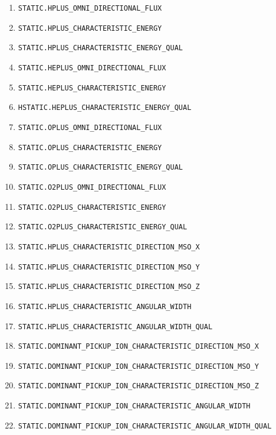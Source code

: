 \documentclass{article}
\begin{document}
\begin{enumerate}
    \item \texttt{STATIC.HPLUS\_OMNI\_DIRECTIONAL\_FLUX}
    \item \texttt{STATIC.HPLUS\_CHARACTERISTIC\_ENERGY}
    \item \texttt{STATIC.HPLUS\_CHARACTERISTIC\_ENERGY\_QUAL}
    \item \texttt{STATIC.HEPLUS\_OMNI\_DIRECTIONAL\_FLUX}
    \item \texttt{STATIC.HEPLUS\_CHARACTERISTIC\_ENERGY}
    \item \texttt{HSTATIC.HEPLUS\_CHARACTERISTIC\_ENERGY\_QUAL}
    \item \texttt{STATIC.OPLUS\_OMNI\_DIRECTIONAL\_FLUX}
    \item \texttt{STATIC.OPLUS\_CHARACTERISTIC\_ENERGY}
    \item \texttt{STATIC.OPLUS\_CHARACTERISTIC\_ENERGY\_QUAL}
    \item \texttt{STATIC.O2PLUS\_OMNI\_DIRECTIONAL\_FLUX}
    \item \texttt{STATIC.O2PLUS\_CHARACTERISTIC\_ENERGY}
    \item \texttt{STATIC.O2PLUS\_CHARACTERISTIC\_ENERGY\_QUAL}
    \item \texttt{STATIC.HPLUS\_CHARACTERISTIC\_DIRECTION\_MSO\_X}
    \item \texttt{STATIC.HPLUS\_CHARACTERISTIC\_DIRECTION\_MSO\_Y}
    \item \texttt{STATIC.HPLUS\_CHARACTERISTIC\_DIRECTION\_MSO\_Z}
    \item \texttt{STATIC.HPLUS\_CHARACTERISTIC\_ANGULAR\_WIDTH}
    \item \texttt{STATIC.HPLUS\_CHARACTERISTIC\_ANGULAR\_WIDTH\_QUAL}
    \item \texttt{STATIC.DOMINANT\_PICKUP\_ION\_CHARACTERISTIC\_DIRECTION\_MSO\_X}
    \item \texttt{STATIC.DOMINANT\_PICKUP\_ION\_CHARACTERISTIC\_DIRECTION\_MSO\_Y}
    \item \texttt{STATIC.DOMINANT\_PICKUP\_ION\_CHARACTERISTIC\_DIRECTION\_MSO\_Z}
    \item \texttt{STATIC.DOMINANT\_PICKUP\_ION\_CHARACTERISTIC\_ANGULAR\_WIDTH}
    \item \texttt{STATIC.DOMINANT\_PICKUP\_ION\_CHARACTERISTIC\_ANGULAR\_WIDTH\_QUAL}
\end{enumerate}
\end{document}

